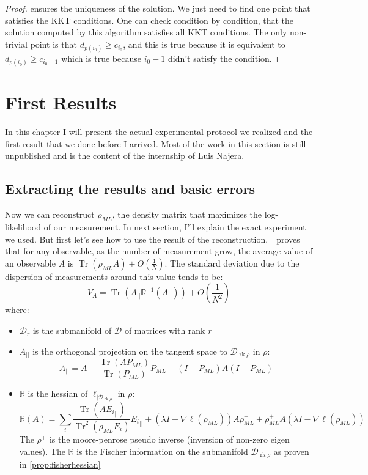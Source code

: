 \documentclass[10pt]{report}
\theoremstyle{plain}
\theoremstyle{definition}
\theoremstyle{remark}
\renewcommand{\geq}{\geqslant}
\DeclareMathOperator{\Tr}{Tr}
\DeclareMathOperator{\rk}{rk}
\newcommand{\ml}{_{M\!L}}
\begin{document}
\begin{proof}
   ensures the uniqueness of the solution. We just need to
  find one point that satisfies the KKT conditions. One can check condition by
  condition, that the solution computed by this algorithm satisfies all KKT
  conditions. The only non-trivial point is that $d_{p(i_0)} \geq c_{i_0}$, and
  this is true because it is equivalent to $d_{p(i_0)} \geq c_{i_0 -1}$ which is
  true because $i_0 -1$ didn't satisfy the condition.
\end{proof}







\chapter{First Results}

In this chapter I will present the actual experimental protocol we realized and the
first result that we done before I arrived.
Most of the work in this section is still unpublished and is the
content of the internship of Luis Najera.

\section{Extracting the results and basic errors}

Now we can reconstruct $\rho\ml$, the density matrix that maximizes the
log-likelihood of our measurement. In next section, I'll explain the exact
experiment we used. But first let's see how to use the result of the
reconstruction.~\cite{SPRAL17}~proves that for any observable, as the number of
measurement grow, the average value of an observable $A$ is $\Tr(\rho_{ML}A) +
O(\frac 1 N)$. The standard deviation due to the dispersion of measurements
 around this value tends to be:
\newcommand{\pr}{_{||}}
\newcommand{\inv}{^{-1}}
\begin{equation}\label{eqn:var}
V_A = \Tr(A\pr \mathbb R\inv(A\pr)) +O(\frac 1 {N^2})
\end{equation}
where:
\begin{itemize}
\item $\mathcal{D}_r$ is the submanifold of $\mathcal{D}$ of matrices with rank $r$
\item $A\pr$ is
  the orthogonal projection on the tangent space to $\mathcal{D}_{\rk \rho}$ in
  $\rho$:
  \[A\pr = A - \frac{\Tr(AP\ml)}{\Tr(P\ml)}P\ml - (I-P\ml)A(I-P\ml)\]
\item $\mathbb R$ is the hessian of $\ell_{|\mathcal{D}_{\rk \rho}}$ in $\rho$:
  \[\mathbb{R}(A) = \sum_i \frac{\Tr(A{E_i}\pr)}{\Tr^2(\rho\ml E_i)} {E_i}\pr +
    (\lambda I - \nabla \ell(\rho\ml))A\rho\ml^+ +
    \rho\ml^+A(\lambda I - \nabla \ell(\rho\ml))\]
  The $\rho^+$ is the moore-penrose pseudo inverse (inversion of non-zero eigen
  values). The $\mathbb R$ is the Fischer information on the submanifold
  $\mathcal{D}_{\rk \rho}$ as proven in \cref{prop:fisherhessian}
\end{itemize}
\end{document}
